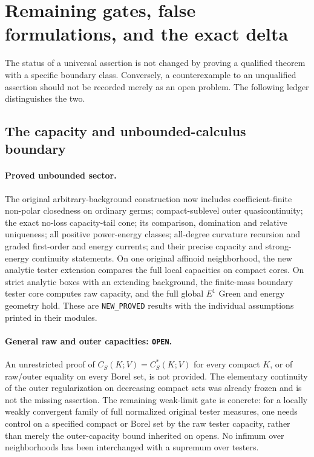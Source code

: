 \section{Remaining gates, false formulations, and the exact delta}
\label{sec:r11-remaining-gates}

The status of a universal assertion is not changed by
proving a qualified theorem with a specific boundary
class.  Conversely, a counterexample to an unqualified
assertion should not be recorded merely as an open
problem.  The following ledger distinguishes the two.

\subsection{The capacity and unbounded-calculus boundary}

\paragraph{Proved unbounded sector.}
The original arbitrary-background construction now includes
coefficient-finite non-polar closedness on ordinary germs;
compact-sublevel outer quasicontinuity; the exact no-loss
capacity-tail cone; its comparison, domination and
relative uniqueness; all positive power-energy classes;
all-degree curvature recursion and graded first-order
and energy currents; and their precise capacity and
strong-energy continuity statements.
On one original affinoid neighborhood, the new analytic
tester extension compares the full local capacities
on compact cores.
On strict analytic boxes with an extending background,
the finite-mass boundary tester core computes raw
capacity, and the full global $E^1$ Green and energy
geometry hold.
These are \texttt{NEW\_PROVED} results with the
individual assumptions printed in their modules.

\paragraph{General raw and outer capacities: \texttt{OPEN}.}
An unrestricted proof of
$C_S(K;V)=C_S^*(K;V)$ for every compact $K$,
or of raw/outer equality on every Borel set, is not
provided.  The elementary continuity of the outer
regularization on decreasing compact sets was already
frozen and is not the missing assertion.
The remaining weak-limit gate is concrete: for a
locally weakly convergent family of full normalized
original tester measures, one needs control on a
specified compact or Borel set by the raw tester
capacity, rather than merely the outer-capacity
bound inherited on opens.
No infimum over neighborhoods has been interchanged
with a supremum over testers.

